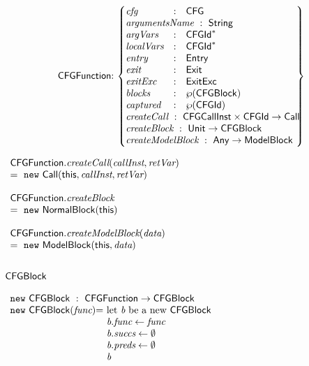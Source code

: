 \vspace*{-2em}
\[
\begin{array}{@{~}r@{~}l@{}l@{~}l}
& \CFGFunction & : &
\begin{Bmatrix*}[l]
\emph{cfg}  & : & \CFG \\
\lefteqn{\emph{argumentsName} \ : \ \String} \\
\emph{argVars} & : & \CFGId^{*} \\
\emph{localVars} & : & \CFGId^{*} \\
\emph{entry} & : & \Entry \\
\emph{exit} & : & \Exit \\
\emph{exitExc} & : & \ExitExc \\
\emph{blocks} & : & \powerset{\CFGBlock}
~~~~~~~~~~~~~~~~~\\
\emph{captured} & : & \powerset{\CFGId} \\
\lefteqn{\emph{createCall} \ : \ \CFGCallInst \times \CFGId \rightarrow \Call} \\
\lefteqn{\emph{createBlock} \ : \ \Unit \rightarrow \CFGBlock} \\
\lefteqn{\emph{createModelBlock} \ : \ \Any \rightarrow \ModelBlock} \\
\end{Bmatrix*}
\end{array}
\]

\hspace*{-2em}
$
\begin{array}{l}
\CFGFunction.\emph{createCall}(\emph{callInst}, \emph{retVar})\\
= \ \new\ \Call(\this, \emph{callInst}, \emph{retVar})\\\\

\CFGFunction.\emph{createBlock}\\
= \ \new\ \NormalBlock(\this)\\\\

\CFGFunction.\emph{createModelBlock}(\emph{data})\\
= \ \new\ \ModelBlock(\this, \emph{data})\\
\end{array}
$

\subsection{$\mbox{\textsf{CFGBlock}}$}
$
\begin{array}{l@{}l@{~}l}
\lefteqn{\new \ \CFGBlock \ : \ \CFGFunction \rightarrow \CFGBlock} \\
\new\ \CFGBlock(\emph{func})
& = & \text{let } \emph{b} \text{ be a new } \CFGBlock\\
& & \emph{b}.\emph{func} \leftarrow \emph{func}\\
& & \emph{b}.\emph{succs} \leftarrow \emptyset\\
& & \emph{b}.\emph{preds} \leftarrow \emptyset\\
& & \emph{b}\\
\end{array}
$

